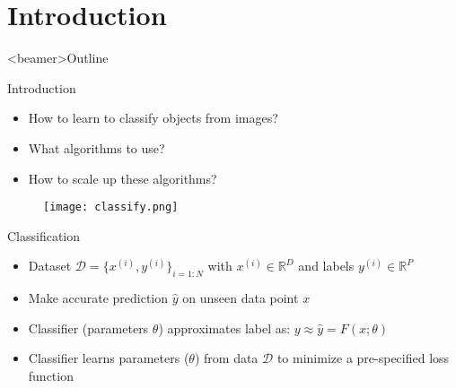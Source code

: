 \section{Introduction}

\begin{frame}<beamer>{Outline}
\end{frame}
  
\begin{frame}{Introduction}
    
    \begin{itemize}
    	\item How to learn to classify objects from images?
        \item What algorithms to use?
        \item How to scale up these algorithms?
	\end{itemize}
 
	\begin{figure}[!tbp]
	  \centering
	    \texttt{[image: classify.png]}
	\end{figure}

\end{frame}

\begin{frame}{Classification}

	\begin{itemize}
	\item Dataset $\mathcal{D} = \{x^{(i)},y^{(i)}\}_{i=1:N}$ with $x^{(i)} \in \mathbb{R}^D$ and labels $y^{(i)} \in \mathbb{R}^P$
	\item Make accurate prediction $\hat{y}$ on unseen data point $x$	
	\item Classifier (parameters $\theta$) approximates label as: $y \approx \hat{y} = F(x; \theta)$	
	\item Classifier learns parameters ($\theta$) from data $\mathcal{D}$ to minimize a pre-specified loss function
	\end{itemize}

\end{frame}

